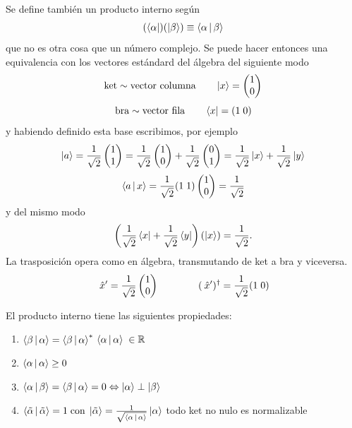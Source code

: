 \documentclass[10pt,oneside]{CBFT_book}
\begin{document}
Se define también un producto interno según
\[
	(\Bra{\alpha})(\Ket{\beta}) \equiv \Braket{\alpha|\beta}
\]
que no es otra cosa que un número complejo. Se puede hacer entonces una equivalencia con los vectores
estándard del álgebra del siguiente modo 
\[
	\text{ket} \sim \text{vector columna} \qquad \Ket{x} = \begin{pmatrix}
	                                                       1 \\
	                                                       0 \\
	                                                      \end{pmatrix}
\]
\[
	\text{bra} \sim \text{vector fila} \qquad \Bra{x} = ( 1 \; 0 )          
\]
y habiendo definido esta base escribimos, por ejemplo
\[
	\Ket{a} = \frac{1}{\sqrt{2}} \begin{pmatrix} 1 \\ 1  \\ \end{pmatrix}  =
	\frac{1}{\sqrt{2}} \begin{pmatrix} 1 \\ 0  \\ \end{pmatrix}  + 
	\frac{1}{\sqrt{2}} \begin{pmatrix} 0 \\ 1  \\ \end{pmatrix} =
	\frac{1}{\sqrt{2}} \Ket{x} + \frac{1}{\sqrt{2}} \Ket{y} 
\]
\[
	\Braket{a|x} = \frac{1}{\sqrt{2}}( 1 \; 1)\begin{pmatrix} 1 \\ 0  \\ \end{pmatrix} = \frac{1}{\sqrt{2}}
\]
y del mismo modo
\[
	\left( \frac{1}{\sqrt{2}} \Bra{x} + \frac{1}{\sqrt{2}} \Bra{y}  \right)
	\left( \Ket{x} \right)= \frac{1}{\sqrt{2}}.
\]
La trasposición opera como en álgebra, transmutando de ket a bra y viceversa.
\[
	\:\hat{x}' = \frac{1}{\sqrt{2}}\begin{pmatrix}
	                            1 \\
	                            0 \\
	                           \end{pmatrix}
	                           \qquad \qquad 
	(\:\hat{x}')^\dagger = \frac{1}{\sqrt{2}} (1 \; 0) 
\]

El producto interno tiene las siguientes propiedades:
\begin{enumerate}
	\item $\Braket{\beta|\alpha} = \Braket{\beta|\alpha}^*$  $ \Braket{\alpha|\alpha} \; \in \mathbb{R}$
	\item $\Braket{\alpha|\alpha} \geq 0$ 
	\item $\Braket{\alpha|\beta} = \Braket{\beta|\alpha} = 0 \Leftrightarrow \Ket{\alpha} \perp \Ket{\beta}$
	\item $\Braket{\tilde{\alpha}|\tilde{\alpha}} = 1 \; \text{con} \; 
	\Ket{\tilde{\alpha}} = \frac{1}{\sqrt{\Braket{\alpha|\alpha}}}\Ket{\alpha} $ todo ket no nulo es normalizable
\end{enumerate}
\end{document}
